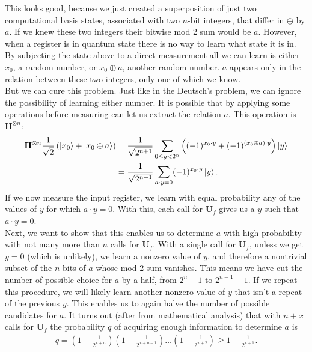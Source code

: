 \documentclass{book}
\theoremstyle{definition}
\newcommand{\nn}{\nonumber}
\newcommand{\f}[2]{\frac{#1}{#2}}
\newcommand{\lp}{\left(}
\newcommand{\rp}{\right)}
\newcommand{\U}{\mathbf{U}}
\newcommand{\had}{\mathbf{H}}
\begin{document}
This looks good, because we just created a superposition of just two computational basis states, associated with two $n$-bit integers, that differ in $\oplus$ by $a$. If we knew these two integers their bitwise mod 2 sum would be $a$. However, when a register is in quantum state there is no way to learn what state it is in. By subjecting the state above to a direct measurement all we can learn is either $x_0$, a random number, or $x_0 \oplus a$, another random number. $a$ appears only in the relation between these two integers, only one of which we know.\\

But we can cure this problem. Just like in the Deutsch's problem, we can ignore the possibility of learning either number. It is possible that by applying some operations before measuring can let us extract the relation $a$. This operation is $\had^{\otimes n}$:
\begin{align}
\had^{\otimes n}\f{1}{\sqrt{2}}\lp \ket{x_0} + \ket{x_0 \oplus a} \rp &= \f{1}{\sqrt{2^{n+1}}}\sum_{0\leq y < 2^n} \lp (-1)^{x_0\cdot y} + (-1)^{(x_0\oplus a)\cdot y} \rp \ket{y}\nn\\
&= \f{1}{\sqrt{2^{n-1}}} \sum_{a\cdot y = 0}(-1)^{x_0\cdot y}\ket{y}.
\end{align}  
If we now measure the input register, we learn with equal probability any of the values of $y$ for which $a\cdot y = 0$. With this, each call for $\U_f$ gives us a $y$ such that $a\cdot y =0$. \\

Next, we want to show that this enables us to determine $a$ with high probability with not many more than $n$ calls for $\U_f$. With a single call for $\U_f$, unless we get $y=0$ (which is unlikely), we learn a nonzero value of $y$, and therefore a nontrivial subset of the $n$ bits of $a$ whose mod 2 sum vanishes. This means we have cut the number of possible choice for $a$ by a half, from $2^n-1$ to $2^{n-1}-1$. If we repeat this procedure, we will likely learn another nonzero value of $y$ that isn't a repeat of the previous $y$. This enables us to again halve the number of possible candidates for $a$. It turns out (after from mathematical analysis) that with $n+x$ calls for $\U_f$ the probability $q$ of acquiring enough information to determine $a$ is
\begin{align}
q = \lp 1-\f{1}{2^{x+n}}\rp \lp 1-\f{1}{2^{x+n-1}}\rp \dots \lp 1-\f{1}{2^{x+2}} \rp \geq 1-\f{1}{2^{x+1}}.
\end{align} 
\end{document}
